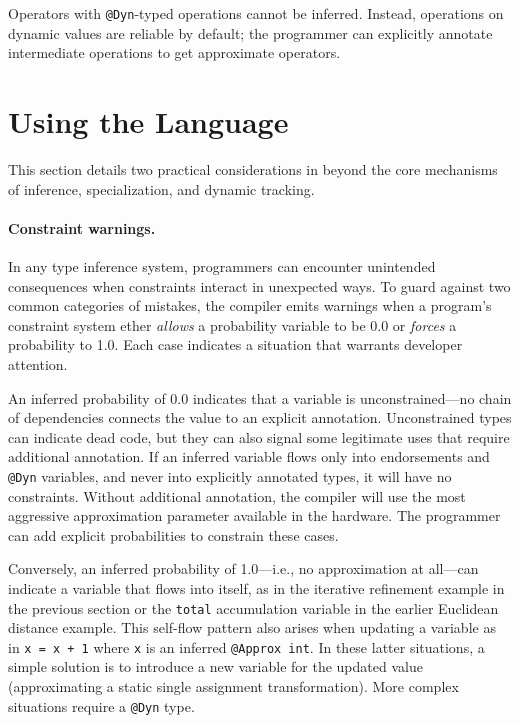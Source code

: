 \documentclass[10pt,nocopyrightspace,preprint]{sigplanconf}
\newcommand{\code}{\lstinline[emphstyle={},keywordstyle={}]}
\begin{document}
Operators with \code{@Dyn}-typed operations cannot be
inferred.
Instead, operations on dynamic values are reliable by default; the programmer
can explicitly annotate intermediate operations to get approximate operators.



\section{Using the Language}
\label{sec:practice}

This section details two practical considerations in \lang beyond the core
mechanisms of inference, specialization, and dynamic tracking.

\paragraph{Constraint warnings.}
\label{sec:warn}

In any type inference system, programmers can encounter unintended
consequences when constraints interact in unexpected ways.
To guard against two common categories of mistakes, the \lang compiler emits
warnings when a program's constraint system ether \emph{allows} a probability
variable to be 0.0 or \emph{forces} a probability to 1.0.
Each case indicates a situation that warrants developer attention.

An inferred probability of 0.0 indicates that a variable is unconstrained---no
chain of dependencies connects the value to an explicit annotation.
Unconstrained types can indicate dead code, but they can also signal some
legitimate uses that require additional annotation.
If an inferred variable flows only into endorsements and \code{@Dyn}
variables, and never into explicitly annotated types, it will have no
constraints.
Without additional annotation, the compiler will use the most aggressive
approximation parameter available in the hardware.
The programmer can add explicit probabilities to constrain these cases.

Conversely, an inferred probability of 1.0---i.e., no approximation at
all---can indicate a variable that flows into itself, as in the iterative
refinement example in the previous section or the \code{total} accumulation
variable in the earlier Euclidean distance example.
This self-flow pattern also arises when updating a variable as in
\code{x = x + 1} where \code{x} is an inferred \code{@Approx int}.
In these latter situations, a simple solution is to introduce a new
variable for the updated value (approximating a static single assignment
transformation).
More complex situations require a \code{@Dyn} type.
\end{document}
